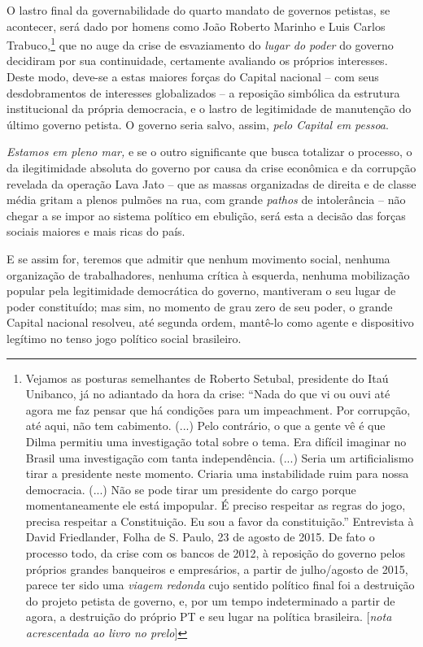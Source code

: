 O lastro final da governabilidade do quarto mandato de governos
petistas, se acontecer, será dado por homens como João Roberto Marinho e
Luis Carlos Trabuco,\footnote{Vejamos as posturas semelhantes de Roberto
  Setubal, presidente do Itaú Unibanco, já no adiantado da hora da
  crise: ``Nada do que vi ou ouvi até agora me faz pensar que há
  condições para um impeachment. Por corrupção, até aqui, não tem
  cabimento. (...) Pelo contrário, o que a gente vê é que Dilma permitiu
  uma investigação total sobre o tema. Era difícil imaginar no Brasil
  uma investigação com tanta independência. (...) Seria um
  artificialismo tirar a presidente neste momento. Criaria uma
  instabilidade ruim para nossa democracia. (...) Não se pode tirar um
  presidente do cargo porque momentaneamente ele está impopular. É
  preciso respeitar as regras do jogo, precisa respeitar a Constituição.
  Eu sou a favor da constituição.'' Entrevista à David Friedlander,
  Folha de S. Paulo, 23 de agosto de 2015. De fato o processo todo, da
  crise com os bancos de 2012, à reposição do governo pelos próprios
  grandes banqueiros e empresários, a partir de julho/agosto de 2015,
  parece ter sido uma \emph{viagem redonda} cujo sentido político final
  foi a destruição do projeto petista de governo, e, por um tempo
  indeterminado a partir de agora, a destruição do próprio PT e seu
  lugar na política brasileira. {[}\emph{nota acrescentada ao livro no
  prelo}{]}} que no auge da crise de esvaziamento do \emph{lugar do
poder} do governo decidiram por sua continuidade, certamente avaliando
os próprios interesses. Deste modo, deve-se a estas maiores forças do
Capital nacional -- com seus desdobramentos de interesses globalizados
-- a reposição simbólica da estrutura institucional da própria
democracia, e o lastro de legitimidade de manutenção do último governo
petista. O governo seria salvo, assim, \emph{pelo Capital em pessoa}.

\emph{Estamos em pleno mar,} e se o outro significante que busca
totalizar o processo, o da ilegitimidade absoluta do governo por causa
da crise econômica e da corrupção revelada da operação Lava Jato -- que
as massas organizadas de direita e de classe média gritam a plenos
pulmões na rua, com grande \emph{pathos} de intolerância -- não chegar a
se impor ao sistema político em ebulição, será esta a decisão das forças
sociais maiores e mais ricas do país.

E se assim for, teremos que admitir que nenhum movimento social, nenhuma
organização de trabalhadores, nenhuma crítica à esquerda, nenhuma
mobilização popular pela legitimidade democrática do governo, mantiveram
o seu lugar de poder constituído; mas sim, no momento de grau zero de
seu poder, o grande Capital nacional resolveu, até segunda ordem,
mantê-lo como agente e dispositivo legítimo no tenso jogo político
social brasileiro.


